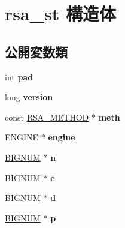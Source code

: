\hypertarget{structrsa__st}{}\section{rsa\+\_\+st 構造体}
\label{structrsa__st}
\subsection*{公開変数類}
\begin{DoxyCompactItemize}
\item 
\hypertarget{structrsa__st_a0ad31a89c1623d6a321162b3e6ad0afd}{}int {\bfseries pad}\label{structrsa__st_a0ad31a89c1623d6a321162b3e6ad0afd}

\item 
\hypertarget{structrsa__st_a431bc852602846bf6893a7df86fc2cb3}{}long {\bfseries version}\label{structrsa__st_a431bc852602846bf6893a7df86fc2cb3}

\item 
\hypertarget{structrsa__st_a9bb9437c0d3cae05cbfdca373504137d}{}const \hyperlink{structrsa__meth__st}{R\+S\+A\+\_\+\+M\+E\+T\+H\+O\+D} $\ast$ {\bfseries meth}\label{structrsa__st_a9bb9437c0d3cae05cbfdca373504137d}

\item 
\hypertarget{structrsa__st_a83c24d8df09a7832a195bfe1b4eb00df}{}E\+N\+G\+I\+N\+E $\ast$ {\bfseries engine}\label{structrsa__st_a83c24d8df09a7832a195bfe1b4eb00df}

\item 
\hypertarget{structrsa__st_a017d8cb5fef3f0ca9432e7616743a8c9}{}\hyperlink{structbignum__st}{B\+I\+G\+N\+U\+M} $\ast$ {\bfseries n}\label{structrsa__st_a017d8cb5fef3f0ca9432e7616743a8c9}

\item 
\hypertarget{structrsa__st_a4681b4d0c295ea5a3f86e7b347d9e4f2}{}\hyperlink{structbignum__st}{B\+I\+G\+N\+U\+M} $\ast$ {\bfseries e}\label{structrsa__st_a4681b4d0c295ea5a3f86e7b347d9e4f2}

\item 
\hypertarget{structrsa__st_ab0b7b533d5c9c40d03844bac392d05fa}{}\hyperlink{structbignum__st}{B\+I\+G\+N\+U\+M} $\ast$ {\bfseries d}\label{structrsa__st_ab0b7b533d5c9c40d03844bac392d05fa}

\item 
\hypertarget{structrsa__st_a1bec6526c3250e11ccce0c549f1b83cd}{}\hyperlink{structbignum__st}{B\+I\+G\+N\+U\+M} $\ast$ {\bfseries p}\label{structrsa__st_a1bec6526c3250e11ccce0c549f1b83cd}


\end{DoxyCompactItemize}
